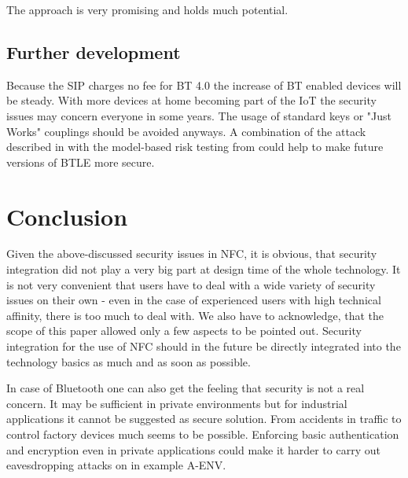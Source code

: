 \documentclass[12pt,a4paper]{article}
\begin{document}
The approach is very promising and holds much potential.

\subsection{Further development}
Because the SIP charges no fee for BT 4.0 the increase of BT enabled devices will be steady. With more devices at home becoming part of the IoT the security issues may concern everyone in some years. The usage of standard keys or "Just Works" couplings should be avoided anyways. A combination of the attack described in \cite{DBLP:conf/woot/Ryan13} with the model-based risk testing from \cite{DBLP:conf/automotiveSS/JakobKSGMSF12} could help to make future versions of BTLE more secure.

\section{Conclusion}

Given the above-discussed security issues in NFC, it is obvious, that security integration did not play a very big part at design time of the whole technology. It is not very convenient that users have to deal with a wide variety of security issues on their own - even in the case of experienced users with high technical affinity, there is too much to deal with. We also have to acknowledge, that the scope of this paper allowed only a few aspects to be pointed out. Security integration for the use of NFC should in the future be directly integrated into the technology basics as much and as soon as possible.

In case of Bluetooth one can also get the feeling that security is not a real concern. It may be sufficient in private environments but for industrial applications it cannot be suggested as secure solution. From accidents in traffic to control factory devices much seems to be possible. Enforcing basic authentication and encryption even in private applications could make it harder to carry out eavesdropping attacks on in example A-ENV.

{}

\end{document}
